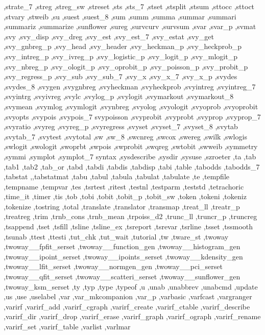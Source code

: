 {{    ,strate_7 ,streg ,streg_sw ,streset ,sts ,sts_7 ,stset ,stsplit
    ,stsum ,sttocc ,sttoct ,stvary ,stweib ,su ,suest ,suest_8 ,sum
    ,summ ,summa ,summar ,summari ,summariz ,summarize ,sunflower
    ,sureg ,survcurv ,survsum ,svar ,svar_p ,svmat ,svy ,svy_disp
    ,svy_dreg ,svy_est ,svy_est_7 ,svy_estat ,svy_get ,svy_gnbreg_p
    ,svy_head ,svy_header ,svy_heckman_p ,svy_heckprob_p ,svy_intreg_p
    ,svy_ivreg_p ,svy_logistic_p ,svy_logit_p ,svy_mlogit_p ,svy_nbreg_p
    ,svy_ologit_p ,svy_oprobit_p ,svy_poisson_p ,svy_probit_p
    ,svy_regress_p ,svy_sub ,svy_sub_7 ,svy_x ,svy_x_7 ,svy_x_p ,svydes
    ,svydes_8 ,svygen ,svygnbreg ,svyheckman ,svyheckprob ,svyintreg
    ,svyintreg_7 ,svyintrg ,svyivreg ,svylc ,svylog_p ,svylogit
    ,svymarkout ,svymarkout_8 ,svymean ,svymlog ,svymlogit ,svynbreg
    ,svyolog ,svyologit ,svyoprob ,svyoprobit ,svyopts ,svypois
    ,svypois_7 svypoisson ,svyprobit ,svyprobt ,svyprop ,svyprop_7
    ,svyratio ,svyreg ,svyreg_p ,svyregress ,svyset ,svyset_7 ,svyset_8
    ,svytab ,svytab_7 ,svytest ,svytotal ,sw ,sw_8 ,swcnreg ,swcox
    ,swereg ,swilk ,swlogis ,swlogit ,swologit ,swoprbt ,swpois
    ,swprobit ,swqreg ,swtobit ,swweib ,symmetry ,symmi ,symplot
    ,symplot_7 syntax ,sysdescribe ,sysdir ,sysuse ,szroeter ,ta ,tab
    ,tab1 ,tab2 ,tab_or ,tabd ,tabdi ,tabdis ,tabdisp ,tabi ,table
    ,tabodds ,tabodds_7 ,tabstat ,,tabstatmat ,tabu ,tabul ,tabula ,tabulat ,tabulate
    ,te ,tempfile ,tempname ,tempvar ,tes ,tsrtest ,ritest ,testnl ,testparm
    ,teststd ,tetrachoric ,time_it ,timer ,tis ,tob ,tobi ,tobit
    ,tobit_p ,tobit_sw ,token ,tokeni ,tokeniz ,tokenize ,tostring
    ,total ,translate ,translator ,transmap ,treat_ll ,treatr_p
    ,treatreg ,trim ,trnb_cons ,trnb_mean ,trpoiss_d2 ,trunc_ll
    ,truncr_p ,truncreg ,tsappend ,tset ,tsfill ,tsline ,tsline_ex
    ,tsreport ,tsrevar ,tsrline ,tsset ,tssmooth ,tsunab ,ttest
    ,ttesti ,tut_chk ,tut_wait ,tutorial ,tw ,tware_st ,twoway
    ,twoway__fpfit_serset ,twoway__function_gen ,twoway__histogram_gen
    ,twoway__ipoint_serset ,twoway__ipoints_serset ,twoway__kdensity_gen
    ,twoway__lfit_serset ,twoway__normgen_gen ,twoway__pci_serset
    ,twoway__qfit_serset ,twoway__scatteri_serset ,twoway__sunflower_gen
    ,twoway_ksm_serset ,ty ,typ ,type ,typeof ,u ,unab ,unabbrev
    ,unabcmd ,update ,us ,use ,uselabel ,var ,var_mkcompanion
    ,var_p ,varbasic ,varfcast ,vargranger ,varirf ,varirf_add
    ,varirf_cgraph ,varirf_create ,varirf_ctable ,varirf_describe
    ,varirf_dir ,varirf_drop ,varirf_erase ,varirf_graph ,varirf_ograph
    ,varirf_rename ,varirf_set ,varirf_table ,varlist ,varlmar
}}
